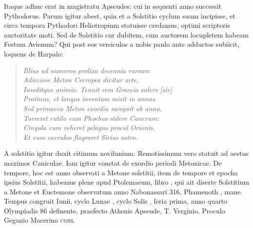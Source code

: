Itaque adhuc erat in magistratu Apseudes:
cui in sequenti anno successit Pythodorus.
Parum igitur abest,
quin et a Solstitio cyclum suum incipisse, et circa tempora Pythodori
Heliotropium statuisse credamus, optimi scriptoris auctoritate
moti.
Sed de Solstitio cur dubitem, cum auctorem locupletem
habeam Festum Avienum?
Qui post eos versiculos a nobis paulo
ante adductos subiicit, loquens de Harpalo:
\begin{quote}
  \emph{Illius ad numeros prolixa decennia rursum}\\
  \emph{Adiecisse Meton Cecropea dicitur arte,}\\
  \emph{Inseditque animis. Tenuit rem Graecia solers [sic]}\\
  \emph{Protinus, et longos inventam misit in annos.}\\
  \emph{Sed primaeva Meton exordia sumpsit ab anno,}\\
  \emph{Torreret rutilo cum Phoebus sidere Cancrum:}\\
  \emph{Cingula cum veheret pelagus procul Orionis,}\\
  \emph{Et cum caeruleo flagraret Sirius astro.}\\
\end{quote}
A solstitio igitur duxit citimum novilunium.
Remotissimum vero
statuit ad aestus maximos Caniculae.
Iam igitur constat de exordio periodi
Metonicae.
De tempore, hoc est anno observati a Metone solstitii,
item de tempore et epocha ipsius Solstitii, habemus plene apud
Ptolemaeum, libro ,
 qui ait diserte Solstitium a Metone et Euctemone
observatum anno Nabonassari 316, Phamenoth , mane.
Tempus congruit  Iunii, cyclo Lunae ,
 cyclo Solis , feria
prima, anno quarto Olympiadis 86 definente, praefecto Athenis
Apseude, T. Verginio, Proculo Geganio Macerino \textsc{coss}.
